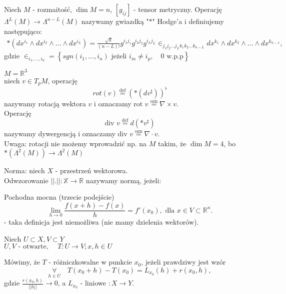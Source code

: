 \documentclass{article}
\begin{document}
\begin{definicja}
Niech $M$ - rozmaitość, $\dim M = n$, $\left[ g_{ij} \right] $ - tensor metryczny. Operację $\Lambda^L(M)\to \Lambda^{n-L}(M)$ nazywamy gwiazdką "$\ast$" Hodge'a i definiujemy następująco:
\begin{align*}
\ast\left( dx^{i_1}\land dx^{i_2}\land \ldots \land dx^{i_L} \right) = \frac{\sqrt{g} }{(n-L)!} g^{i_1j_1}g^{i_2j_2}g^{i_Lj_L}\in _{j_1j_2\ldots j_L k_1k_2\ldots k_{n-L}}dx^{k_1}\land dx^{k_2}\land \ldots \land dx^{k_{n-1}}
,\end{align*}
gdzie $\in _{i_1,\ldots,i_n} = \left\{ sgn(i_1,\ldots,i_n) \text{ jeżeli } i_m \neq i_p,\quad 0 \text{ w.p.p} \right\}$
\end{definicja}
\begin{definicja}
$M = \mathbb{R}^3$\\
niech $v\in T_pM$, operację
\[
rot(v) \overset{\text{def}}{=} \left( \ast\left( dv^\sharp \right)  \right) ^\flat
\]
nazywamy rotacją wektora $v$ i oznaczamy
$\text{rot } v \overset{\text{ozn}}{=} \nabla\times v$.\\
Operację \[
\text{div }v \overset{\text{def}}{=} d\left( \ast v^\sharp \right)
\]
nazywamy dywergencją i oznaczamy $\text{div }v \overset{\text{ozn}}{=} \nabla \cdot v$.\\
Uwaga: rotacji nie możemy wprowadzić np. na $M$ takim, że $\dim M = 4$, bo $\ast(\Lambda^2(M))\to \Lambda^2(M)$
\end{definicja}
\begin{definicja}
Norma: niech $X$ - przestrzeń wektorowa.\\
Odwzorowanie $||.||: \mathbb{X}\to \mathbb{R}$ nazywamy normą, jeżeli:
\end{definicja}
\begin{definicja}
Pochodna mocna (trzecie podejście)
\[
\lim\limits_{h \to 0}\frac{f(x+h) - f(x)}{h} = f'(x_0), \text{ dla }x\in V\subset \mathbb{R}^{n}
.\]
- taka definicja jest niemożliwa (nie mamy dzielenia wektorów).
\end{definicja}
\pagebreak
\begin{definicja}

Niech $U \subset X, V\subset Y$\\
$U,V\text{ - otwarte, }\quad T:U\to V; x,h\in U$

Mówimy, że $T$ - różniczkowalne w punkcie $x_0$, jeżeli prawdziwy jest wzór $$\underset{h\in U}{\forall} \quad T(x_0+h) - T(x_0) = L_{x_0} (h) + r(x_0,h),$$
gdzie $\frac{r(x_0,h)}{||h||}\to 0$, a $L_{x_0}$ - liniowe $: X\to Y$.
\end{definicja}
\end{document}
